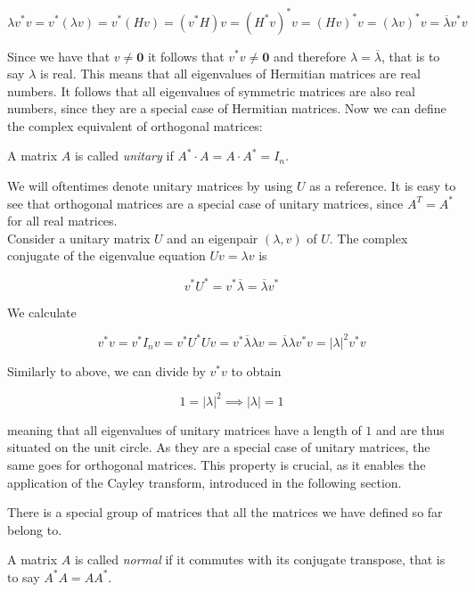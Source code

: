 \[
    \lambda v^* v = v^* \left( \lambda v \right)
    = v^* \left( H v \right)
    = \left(v^* H \right) v
    = \left( H^* v \right)^* v
    = \left( H v \right)^* v
    = (\lambda v)^* v
    = \overline{\lambda} v^* v
\]

Since we have that $v \neq \mathbf{0}$ it follows that $v^* v \neq \mathbf{0}$
and therefore $\lambda = \overline{\lambda}$, that is to say $\lambda$ is real.
This means that all eigenvalues of Hermitian matrices are real numbers.
It follows that all eigenvalues of symmetric matrices are also real numbers,
since they are a special case of Hermitian matrices.
Now we can define the complex equivalent of orthogonal matrices:

\begin{definition}
    A matrix $A$ is called \emph{unitary} if $A^* \cdot A = A \cdot A^* = I_n$.
\end{definition}

We will oftentimes denote unitary matrices by using $U$ as a reference.
It is easy to see that orthogonal matrices are a special case of unitary matrices,
since $A^T = A^*$ for all real matrices.\\
Consider a unitary matrix $U$ and an eigenpair $(\lambda, v)$ of $U$.
The complex conjugate of the eigenvalue equation $U v = \lambda v$ is

\[
    v^* U^* = v^* \overline{\lambda} = \overline{\lambda} v^*
\]

We calculate

\[
    v^* v = v^* I_n v = v^* U^* U v = v^* \overline{\lambda} \lambda v = \overline{\lambda} \lambda v^* v = \left| \lambda \right|^2 v^* v
\]

Similarly to above, we can divide by $v^* v$ to obtain

\[
    1 = \left| \lambda \right|^2 \implies \left| \lambda \right| = 1
\]

meaning that all eigenvalues of unitary matrices have a length of $1$ and are thus situated on the unit circle.
As they are a special case of unitary matrices, the same goes for orthogonal matrices.
This property is crucial, as it enables the application of the Cayley transform,
introduced in the following section.

There is a special group of matrices that all the matrices we have defined so far belong to.

\begin{definition}
    A matrix $A$ is called \emph{normal} if it commutes with its conjugate transpose,
    that is to say $A^* A = A A^*$.
\end{definition}

